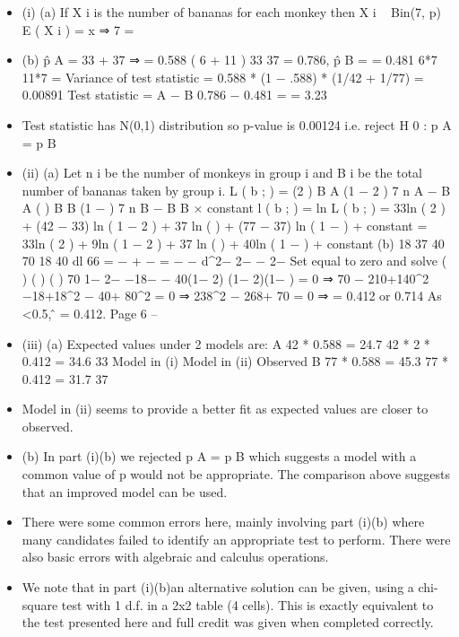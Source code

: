 \documentclass[a4paper,12pt]{article}
\begin{document}
\begin{itemize}
\item (i)
(a)
If X i is the number of bananas for each monkey then X i ~ Bin(7, p)
E ( X i ) = x ⇒ 7  =
\item (b)
p̂ A =
33 + 37
⇒  = 0.588
( 6 + 11 )
33
37
= 0.786, p̂ B =
= 0.481
6*7
11*7
 = Variance of test statistic = 0.588 * (1 − .588) * (1/42 + 1/77)
= 0.00891
Test statistic =
 A −  B 0.786 − 0.481
=
= 3.23
\item Test statistic has N(0,1) distribution so p-value is 0.00124
i.e. reject H 0 : p A = p B
\item (ii)
(a)
Let n i be the number of monkeys in group i and B i be the total number
of bananas taken by group i.
L ( b ; \theta ) = (2 \theta ) B A (1 − 2 \theta ) 7 n A − B A ( \theta ) B B (1 − \theta ) 7 n B − B B × constant
l ( b ; \theta ) = ln L ( b ; \theta )
= 33ln ( 2 \theta ) + (42 − 33) ln ( 1 − 2 \theta ) + 37 ln ( \theta ) + (77 − 37) ln ( 1 − \theta ) + constant
= 33ln ( 2 \theta ) + 9ln ( 1 − 2 \theta ) + 37 ln ( \theta ) + 40ln ( 1 − \theta ) + constant
(b)
18
37 40 70 18
40
dl 66
= −
+ −
= −
−
d\theta^2− 2\theta {}− \theta {}− 2− \theta
Set equal to zero and solve
(
) (
)
(
)
70 1− 2− \theta −18− \theta − 40\theta(1− 2\theta)
\theta(1− 2\theta)(1− \theta)
= 0
⇒ 70 − 210\theta +140\theta^2 −18\theta +18\theta^2 − 40\theta + 80\theta^2 = 0
⇒ 238\theta^2 − 268\theta + 70 = 0
⇒ \theta = 0.412 or 0.714
As \theta<0.5, \thetâ = 0.412.
Page 6 – %
\item (iii)
(a)
Expected values under 2 models are:
A
42 * 0.588 = 24.7
42 * 2 * 0.412 = 34.6
33
Model in (i)
Model in (ii)
Observed
B
77 * 0.588 = 45.3
77 * 0.412 = 31.7
37
\item Model in (ii) seems to provide a better fit as expected values are
closer to observed.
\item (b)
In part (i)(b) we rejected p A = p B which suggests a model with a
common value of p would not be appropriate. The comparison above
suggests that an improved model can be used.
\item There were some common errors here, mainly involving part (i)(b) where many candidates
failed to identify an appropriate test to perform. There were also basic errors with algebraic
and calculus operations.
\item We note that in part (i)(b)an alternative solution can be given, using a chi-square test with
1 d.f. in a 2x2 table (4 cells). This is exactly equivalent to the test presented here and full
credit was given when completed correctly.
\end{itemize}
\end{document}

